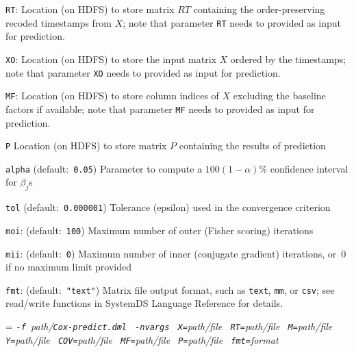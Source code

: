 \begin{Description}
\item[{\tt RT}:]
Location (on HDFS) to store matrix $RT$ containing the order-preserving recoded timestamps from $X$; note that parameter {\tt RT} needs to provided as input for prediction.
\item[{\tt XO}:]
Location (on HDFS) to store the input matrix $X$ ordered by the timestamps; note that parameter {\tt XO} needs to provided as input for prediction.
\item[{\tt MF}:]
Location (on HDFS) to store column indices of $X$ excluding the baseline factors if available; note that parameter {\tt MF} needs to provided as input for prediction.
\item[{\tt P}] 
Location (on HDFS) to store matrix $P$ containing the results of prediction
\item[{\tt alpha}](default:\mbox{ }{\tt 0.05})
Parameter to compute a $100(1-\alpha)\%$ confidence interval for $\beta_j$s 
\item[{\tt tol}](default:\mbox{ }{\tt 0.000001})
Tolerance (epsilon) used in the convergence criterion
\item[{\tt moi}:] (default:\mbox{ }{\tt 100})
Maximum number of outer (Fisher scoring) iterations
\item[{\tt mii}:] (default:\mbox{ }{\tt 0})
Maximum number of inner (conjugate gradient) iterations, or~0 if no maximum
limit provided
\item[{\tt fmt}:] (default:\mbox{ }{\tt "text"})
Matrix file output format, such as {\tt text}, {\tt mm}, or {\tt csv};
see read/write functions in SystemDS Language Reference for details.
\end{Description}


 \smallskip
 \smallskip
 
 {\hangindent=\parindent\noindent\it%
 	{\tt{}-f }path/\/{\tt{}Cox-predict.dml}
 	{\tt{} -nvargs}
 	{\tt{} X=}path/file
 	{\tt{} RT=}path/file
 	{\tt{} M=}path/file
 	{\tt{} Y=}path/file
 	{\tt{} COV=}path/file
 	{\tt{} MF=}path/file
 	{\tt{} P=}path/file
 	{\tt{} fmt=}format
 	
 }\smallskip
 
